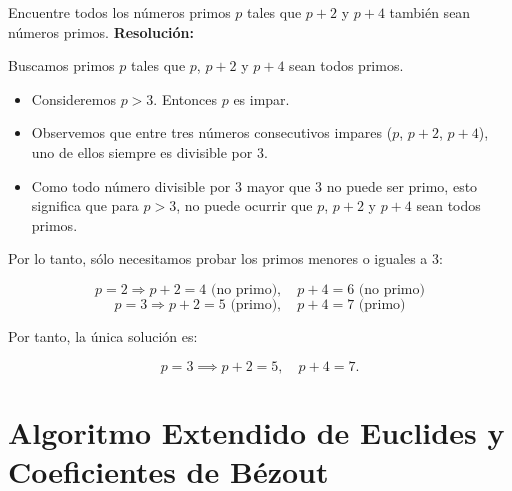 \documentclass[a4paper,12pt]{article}
\begin{document}
\begin{ejercicio}[title=Ejercicio 21]
Encuentre todos los números primos $p$ tales que $p+2$ y $p+4$ también sean números primos.
\tcblower
\textbf{Resolución:}

Buscamos primos $p$ tales que $p$, $p+2$ y $p+4$ sean todos primos.  

\begin{itemize}
    \item Consideremos $p > 3$. Entonces $p$ es impar.
    \item Observemos que entre tres números consecutivos impares ($p$, $p+2$, $p+4$), uno de ellos siempre es divisible por 3.
    \item Como todo número divisible por 3 mayor que 3 no puede ser primo, esto significa que para $p>3$, no puede ocurrir que $p$, $p+2$ y $p+4$ sean todos primos.
\end{itemize}

Por lo tanto, sólo necesitamos probar los primos menores o iguales a 3:

\[
p = 2 \Rightarrow p+2 = 4 \text{ (no primo)}, \quad p+4 = 6 \text{ (no primo)}
\]
\[
p = 3 \Rightarrow p+2 = 5 \text{ (primo)}, \quad p+4 = 7 \text{ (primo)}
\]

Por tanto, la única solución es:

\[
\boxed{p = 3} \implies p+2 = 5, \quad p+4 = 7.
\]

\end{ejercicio}

\section{Algoritmo Extendido de Euclides y Coeficientes de Bézout}
\end{document}
